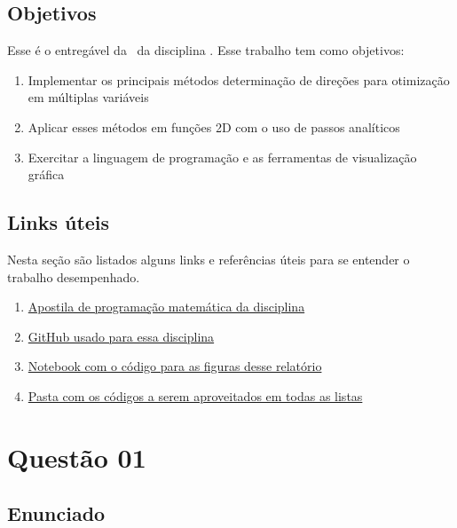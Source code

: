 \documentclass[10pt, a4paper]{article}
\begin{document}
\subsection{Objetivos}

Esse é o entregável da \TITLE \ da disciplina \DISCIPLINE. Esse trabalho tem como objetivos:

\begin{enumerate}
  \item Implementar os principais métodos determinação de direções para otimização em múltiplas variáveis
  \item Aplicar esses métodos em funções 2D com o uso de passos analíticos
  \item Exercitar a linguagem de programação e as ferramentas de visualização gráfica
\end{enumerate}

\subsection{Links úteis}\label{links}

Nesta seção são listados alguns links e referências úteis para se entender o trabalho desempenhado.

\begin{enumerate}
  \item \href{https://web.tecgraf.puc-rio.br/~ivan/MEC2403/ProgMatematica_VazPereiraMenezes-Ago2012.pdf}{Apostila de programação matemática da disciplina}
  \item \href{https://github.com/prj-phcp/MEC2403_Activities}{GitHub usado para essa disciplina}
  \item \href{https://github.com/prj-phcp/MEC2403_Activities/blob/master/Lista2/Lista2.ipynb}{Notebook com o código para as figuras desse relatório}
  \item \href{https://github.com/prj-phcp/MEC2403_Activities/blob/master/packages}{Pasta com os códigos a serem aproveitados em todas as listas}
\end{enumerate}

\section{Questão 01}\label{sec:q01}

\subsection{Enunciado}
\end{document}
